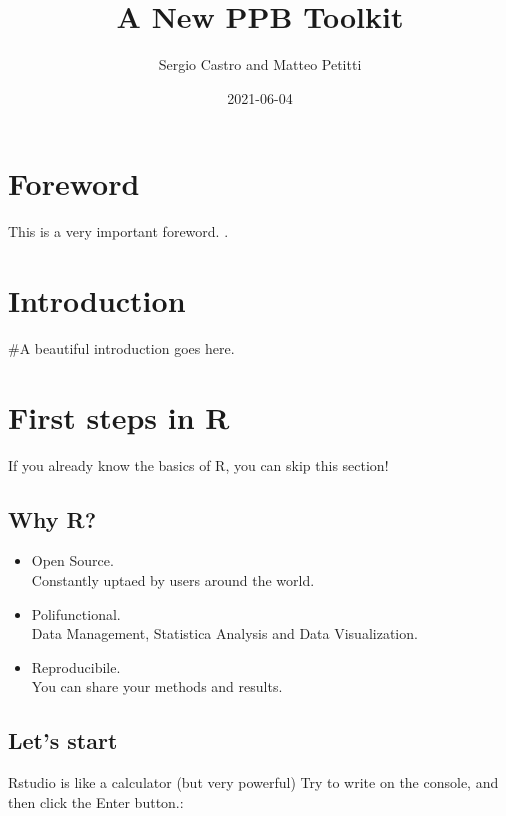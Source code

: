 \documentclass[
]{book}
\title{A New PPB Toolkit}
\author{Sergio Castro and Matteo Petitti}
\date{2021-06-04}
\begin{document}
\maketitle

{
\setcounter{tocdepth}{1}
\tableofcontents
}
\hypertarget{foreword}{%
\chapter{Foreword}\label{foreword}}

This is a very important foreword.
.

\hypertarget{intro}{%
\chapter{Introduction}\label{intro}}

\#A beautiful introduction goes here.

\hypertarget{first-steps-in-r}{%
\chapter{First steps in R}\label{first-steps-in-r}}

If you already know the basics of R, you can skip this section!

\hypertarget{why-r}{%
\section{Why R?}\label{why-r}}

\begin{itemize}
\item
  Open Source.\\
  Constantly uptaed by users around the world.
\item
  Polifunctional.\\
  Data Management, Statistica Analysis and Data Visualization.
\item
  Reproducibile.\\
  You can share your methods and results.
\end{itemize}

\hypertarget{lets-start}{%
\section{Let's start}\label{lets-start}}

Rstudio is like a calculator (but very powerful)
Try to write on the console, and then click the Enter button.:
\end{document}
